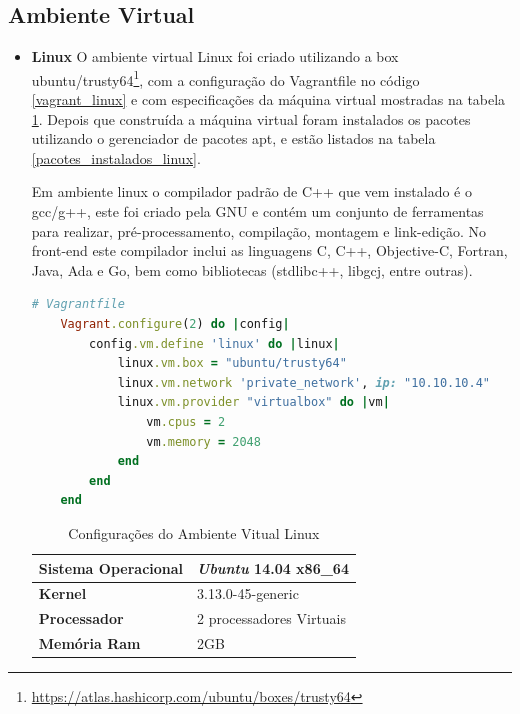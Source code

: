 \subsection{Ambiente Virtual}

\begin{itemize}

    \item \textbf{Linux}
        \subitem  O ambiente virtual Linux foi criado utilizando a box
 ubuntu/trusty64\footnote{\url{https://atlas.hashicorp.com/ubuntu/boxes/trusty64}},
 com a configuração do Vagrantfile no código \ref{vagrant_linux} e com especificações
 da máquina virtual mostradas na tabela \ref{especificacoes_linux}.
 Depois que construída a máquina virtual foram instalados os pacotes utilizando o
 gerenciador de pacotes apt, e estão listados na tabela \ref{pacotes_instalados_linux}.

Em ambiente linux o compilador padrão de C++ que vem instalado é o gcc/g++, este foi
 criado pela GNU e contém um conjunto de ferramentas para realizar, pré-processamento,
 compilação, montagem e link-edição. No front-end este compilador inclui as linguagens C,
 C++, Objective-C, Fortran, Java, Ada e Go, bem como bibliotecas
 (stdlibc++, libgcj, entre outras).


\begin{lstlisting}[language=ruby, caption={Vagrantfile com configurações da máquina virtual linux},
                  label=vagrant_linux]
    # Vagrantfile
    Vagrant.configure(2) do |config|
        config.vm.define 'linux' do |linux|
            linux.vm.box = "ubuntu/trusty64"
            linux.vm.network 'private_network', ip: "10.10.10.4"
            linux.vm.provider "virtualbox" do |vm| 
                vm.cpus = 2
                vm.memory = 2048
            end
        end              
    end
\end{lstlisting}

\begin{table}[h]
\centering
\begin{tabular}{ll}
\textbf{Sistema Operacional} & \textit{Ubuntu} 14.04 x86\_64 \\ \toprule
\textbf{Kernel} & 3.13.0-45-generic  \\ \midrule 
\textbf{Processador} & 2 processadores Virtuais \\ \midrule
\textbf{Memória Ram} & 2GB  \\ \bottomrule 
\end{tabular} 
\caption{Configurações do Ambiente Vitual Linux}
\label{especificacoes_linux}
\end{table}


\end{itemize}
